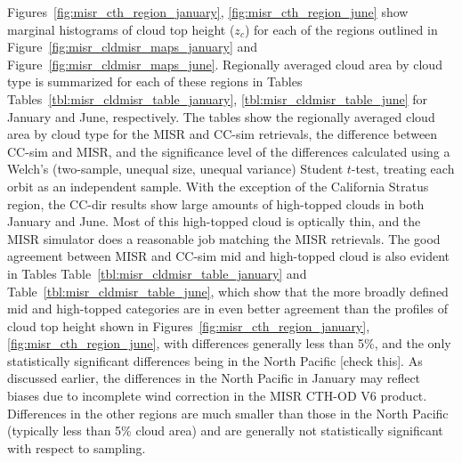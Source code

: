 Figures~\ref{fig:misr_cth_region_january}, \ref{fig:misr_cth_region_june}
show marginal histograms of cloud top height (\(z_c\)) for each of the
regions outlined in Figure~\ref{fig:misr_cldmisr_maps_january} and
Figure~\ref{fig:misr_cldmisr_maps_june}. Regionally averaged cloud area
by cloud type is summarized for each of these regions in Tables
Tables~\ref{tbl:misr_cldmisr_table_january}, \ref{tbl:misr_cldmisr_table_june}
for January and June, respectively. The tables show the regionally
averaged cloud area by cloud type for the MISR and CC-sim retrievals,
the difference between CC-sim and MISR, and the significance level of
the differences calculated using a Welch's (two-sample, unequal size,
unequal variance) Student \(t\)-test, treating each orbit as an
independent sample. With the exception of the California Stratus region,
the CC-dir results show large amounts of high-topped clouds in both
January and June. Most of this high-topped cloud is optically thin, and
the MISR simulator does a reasonable job matching the MISR retrievals.
The good agreement between MISR and CC-sim mid and high-topped cloud is
also evident in Tables Table~\ref{tbl:misr_cldmisr_table_january} and
Table~\ref{tbl:misr_cldmisr_table_june}, which show that the more
broadly defined mid and high-topped categories are in even better
agreement than the profiles of cloud top height shown in
Figures~\ref{fig:misr_cth_region_january}, \ref{fig:misr_cth_region_june},
with differences generally less than 5\%, and the only statistically
significant differences being in the North Pacific {[}check this{]}. As
discussed earlier, the differences in the North Pacific in January may
reflect biases due to incomplete wind correction in the MISR CTH-OD V6
product. Differences in the other regions are much smaller than those in
the North Pacific (typically less than 5\% cloud area) and are generally
not statistically significant with respect to sampling.

